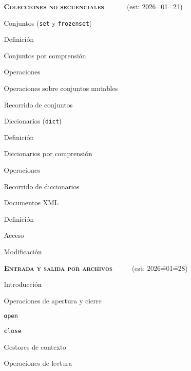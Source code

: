 \begin{longenum}
    \item \textbf{\textsc{Colecciones no secuenciales}} \ \ \ \ \ \ (est: 2026\==01\==21)
    \begin{longenum}
        \item Conjuntos (\texttt{set} y \texttt{frozenset})
        \begin{longenum}
            \item Definición
            \item Conjuntos por comprensión
            \item Operaciones
            \item Operaciones sobre conjuntos mutables
            \item Recorrido de conjuntos
        \end{longenum}
        \item Diccionarios (\texttt{dict})
        \begin{longenum}
            \item Definición
            \item Diccionarios por comprensión
            \item Operaciones
            \item Recorrido de diccionarios
        \end{longenum}
        \item Documentos XML
        \begin{longenum}
            \item Definición
            \item Acceso
            \item Modificación
        \end{longenum}
    \end{longenum}
    \item \textbf{\textsc{Entrada y salida por archivos}} \ \ \ \ \ (est: 2026\==01\==28)
    \begin{longenum}
        \item Introducción
        \item Operaciones de apertura y cierre
        \begin{longenum}
            \item \texttt{open}
            \item \texttt{close}
            \item Gestores de contexto
        \end{longenum}
        \item Operaciones de lectura

\end{longenum}
\end{longenum}
